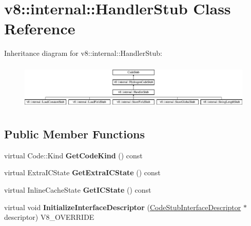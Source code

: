 \hypertarget{classv8_1_1internal_1_1_handler_stub}{}\section{v8\+:\+:internal\+:\+:Handler\+Stub Class Reference}
\label{classv8_1_1internal_1_1_handler_stub}
Inheritance diagram for v8\+:\+:internal\+:\+:Handler\+Stub\+:\begin{figure}[H]
\begin{center}
\leavevmode
\includegraphics[height=2.251256cm]{classv8_1_1internal_1_1_handler_stub}
\end{center}
\end{figure}
\subsection*{Public Member Functions}
\begin{DoxyCompactItemize}
\item 
\hypertarget{classv8_1_1internal_1_1_handler_stub_a8bca7678778786289d3e9d3306304033}{}virtual Code\+::\+Kind {\bfseries Get\+Code\+Kind} () const \label{classv8_1_1internal_1_1_handler_stub_a8bca7678778786289d3e9d3306304033}

\item 
\hypertarget{classv8_1_1internal_1_1_handler_stub_a0a4c253abf1a1d25477fdc3a44c098d3}{}virtual Extra\+I\+C\+State {\bfseries Get\+Extra\+I\+C\+State} () const \label{classv8_1_1internal_1_1_handler_stub_a0a4c253abf1a1d25477fdc3a44c098d3}

\item 
\hypertarget{classv8_1_1internal_1_1_handler_stub_abc955753dddd54c10097f2f6a42d3c02}{}virtual Inline\+Cache\+State {\bfseries Get\+I\+C\+State} () const \label{classv8_1_1internal_1_1_handler_stub_abc955753dddd54c10097f2f6a42d3c02}

\item 
\hypertarget{classv8_1_1internal_1_1_handler_stub_afbee79a607ac5fcea0801c950378cf3f}{}virtual void {\bfseries Initialize\+Interface\+Descriptor} (\hyperlink{classv8_1_1internal_1_1_code_stub_interface_descriptor}{Code\+Stub\+Interface\+Descriptor} $\ast$descriptor) V8\+\_\+\+O\+V\+E\+R\+R\+I\+D\+E\label{classv8_1_1internal_1_1_handler_stub_afbee79a607ac5fcea0801c950378cf3f}

\end{DoxyCompactItemize}
